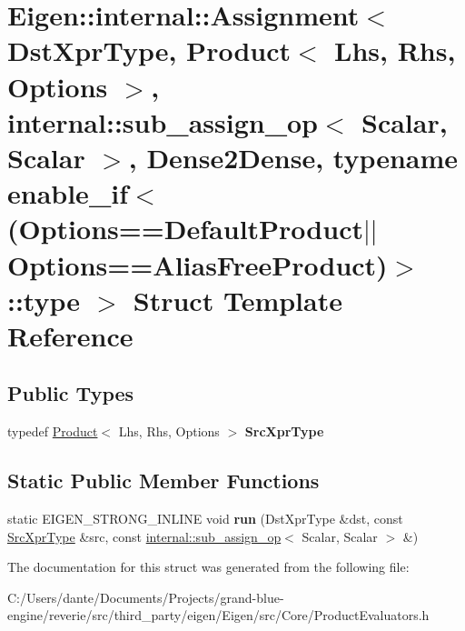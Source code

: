 \hypertarget{struct_eigen_1_1internal_1_1_assignment_3_01_dst_xpr_type_00_01_product_3_01_lhs_00_01_rhs_00_01ed0bc91f79379e8268cc6b22ba7de0c6}{}\section{Eigen\+::internal\+::Assignment$<$ Dst\+Xpr\+Type, Product$<$ Lhs, Rhs, Options $>$, internal\+::sub\+\_\+assign\+\_\+op$<$ Scalar, Scalar $>$, Dense2\+Dense, typename enable\+\_\+if$<$(Options==Default\+Product$\vert$$\vert$\+Options==Alias\+Free\+Product)$>$\+::type $>$ Struct Template Reference}
\label{struct_eigen_1_1internal_1_1_assignment_3_01_dst_xpr_type_00_01_product_3_01_lhs_00_01_rhs_00_01ed0bc91f79379e8268cc6b22ba7de0c6}
\subsection*{Public Types}
\begin{DoxyCompactItemize}
\item 
\mbox{\label{struct_eigen_1_1internal_1_1_assignment_3_01_dst_xpr_type_00_01_product_3_01_lhs_00_01_rhs_00_01ed0bc91f79379e8268cc6b22ba7de0c6_aaa296ef17ca0ac8a53b602b94f2d69b2}} 
typedef \mbox{\hyperlink{class_eigen_1_1_product}{Product}}$<$ Lhs, Rhs, Options $>$ {\bfseries Src\+Xpr\+Type}
\end{DoxyCompactItemize}
\subsection*{Static Public Member Functions}
\begin{DoxyCompactItemize}
\item 
\mbox{\label{struct_eigen_1_1internal_1_1_assignment_3_01_dst_xpr_type_00_01_product_3_01_lhs_00_01_rhs_00_01ed0bc91f79379e8268cc6b22ba7de0c6_a22afc17b68523d7cb996c6976ab19be8}} 
static E\+I\+G\+E\+N\+\_\+\+S\+T\+R\+O\+N\+G\+\_\+\+I\+N\+L\+I\+NE void {\bfseries run} (Dst\+Xpr\+Type \&dst, const \mbox{\hyperlink{class_eigen_1_1_product}{Src\+Xpr\+Type}} \&src, const \mbox{\hyperlink{struct_eigen_1_1internal_1_1sub__assign__op}{internal\+::sub\+\_\+assign\+\_\+op}}$<$ Scalar, Scalar $>$ \&)
\end{DoxyCompactItemize}


The documentation for this struct was generated from the following file\+:\begin{DoxyCompactItemize}
\item 
C\+:/\+Users/dante/\+Documents/\+Projects/grand-\/blue-\/engine/reverie/src/third\+\_\+party/eigen/\+Eigen/src/\+Core/Product\+Evaluators.\+h\end{DoxyCompactItemize}
